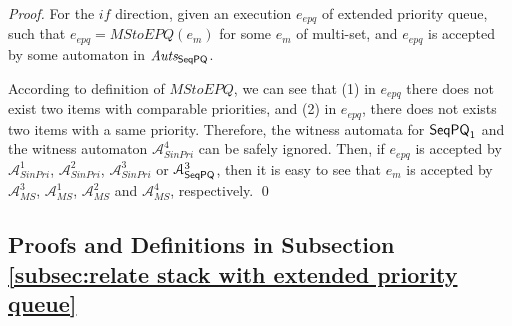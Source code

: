 {\begin {proof}
For the $\textit{if}$ direction, given an execution $e_{\textit{epq}}$ of extended priority queue, such that $e_{\textit{epq}} = \textit{MStoEPQ}(e_m)$ for some $e_m$ of multi-set, and $e_{\textit{epq}}$ is accepted by some automaton in $\textit{Auts}_{\mathsf{SeqPQ}}$.

According to definition of $\textit{MStoEPQ}$, we can see that (1) in $e_{\textit{epq}}$ there does not exist two items with comparable priorities, and (2) in $e_{\textit{epq}}$, there does not exists two items with a same priority. Therefore, the witness automata for $\mathsf{SeqPQ}_1$ and the witness automaton $\mathcal{A}_{\textit{SinPri}}^4$ can be safely ignored. Then, if $e_{\textit{epq}}$ is accepted by $\mathcal{A}_{\textit{SinPri}}^1$, $\mathcal{A}_{\textit{SinPri}}^2$, $\mathcal{A}_{\textit{SinPri}}^3$ or $\mathcal{A}_{\mathsf{SeqPQ}}^3$, then it is easy to see that $e_m$ is accepted by $\mathcal{A}_{\textit{MS}}^3$, $\mathcal{A}_{\textit{MS}}^1$, $\mathcal{A}_{\textit{MS}}^2$ and $\mathcal{A}_{\textit{MS}}^4$, respectively. \qed
\end {proof}



\subsection{Proofs and Definitions in Subsection \ref{subsec:relate stack with extended priority queue}}
\label{subsec:appendix proof and definition in section relate stack with extended priority queue}
}





